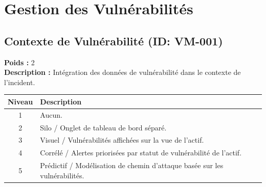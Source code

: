 \documentclass{article}
\begin{document}
\section{Gestion des Vulnérabilités}
\subsection{Contexte de Vulnérabilité (ID: VM-001)}
\textbf{Poids :} 2 \\
\textbf{Description :} Intégration des données de vulnérabilité dans le contexte de l'incident.
\vspace{0.3cm}
\begin{longtable}{|c|p{12cm}|}
\hline
\rowcolor{lightgray} \textbf{Niveau} & \textbf{Description} \\ \hline
1 & Aucun. \\ \hline
2 & Silo / Onglet de tableau de bord séparé. \\ \hline
3 & Visuel / Vulnérabilités affichées sur la vue de l'actif. \\ \hline
4 & Corrélé / Alertes priorisées par statut de vulnérabilité de l'actif. \\ \hline
5 & Prédictif / Modélisation de chemin d'attaque basée sur les vulnérabilités. \\ \hline
\end{longtable}
\vspace{0.5cm}
\end{document}
